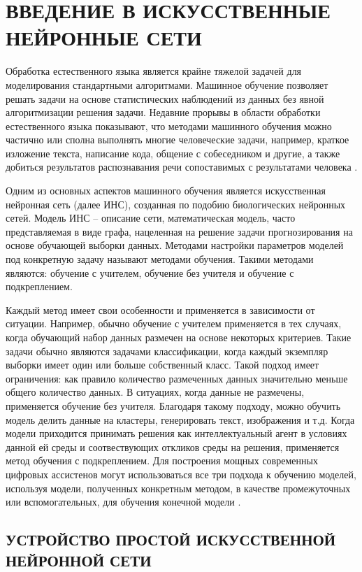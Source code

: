 \section{ВВЕДЕНИЕ В ИСКУССТВЕННЫЕ НЕЙРОННЫЕ СЕТИ}
Обработка естественного языка является крайне тяжелой задачей для моделирования стандартными алгоритмами. Машинное обучение позволяет решать задачи на основе статистических наблюдений из данных без явной алгоритмизации решения задачи. Недавние прорывы в области обработки естественного языка показывают, что методами машинного обучения можно частично или сполна выполнять многие человеческие задачи, например, краткое изложение текста, написание кода, общение с собеседником и другие, а также добиться результатов распознавания речи сопоставимых с результатами человека \cite{human-wer,whisper}.

Одним из основных аспектов машинного обучения является искусственная нейронная сеть (далее ИНС), созданная по подобию биологических нейронных сетей. Модель ИНС -- описание сети, математическая модель, часто представляемая в виде графа, нацеленная на решение задачи прогнозирования на основе обучающей выборки данных. Методами настройки параметров моделей под конкретную задачу называют методами обучения. Такими методами являются: обучение с учителем, обучение без учителя и обучение с подкреплением.

Каждый метод имеет свои особенности и применяется в зависимости от ситуации. Например, обычно обучение с учителем применяется в тех случаях, когда обучающий набор данных размечен на основе некоторых критериев. Такие задачи обычно являются задачами классификации, когда каждый экземпляр выборки имеет один или больше собственный класс. Такой подход имеет ограничения: как правило количество размеченных данных значительно меньше общего количество данных. В ситуациях, когда данные не размечены, применяется обучение без учителя. Благодаря такому подходу, можно обучить модель делить данные на кластеры, генерировать текст, изображения и т.д. Когда модели приходится принимать решения как интеллектуальный агент в условиях данной ей среды и соотвествующих откликов среды на решения, применяется метод обучения с подкреплением. Для построения мощных современных цифровых ассистенов могут использоваться все три подхода к обучению моделей, используя модели, полученных конкретным методом, в качестве промежуточных или вспомогательных, для обучения конечной модели \cite{state-of-gpt}.

\subsection{УСТРОЙСТВО ПРОСТОЙ ИСКУССТВЕННОЙ НЕЙРОННОЙ СЕТИ}

